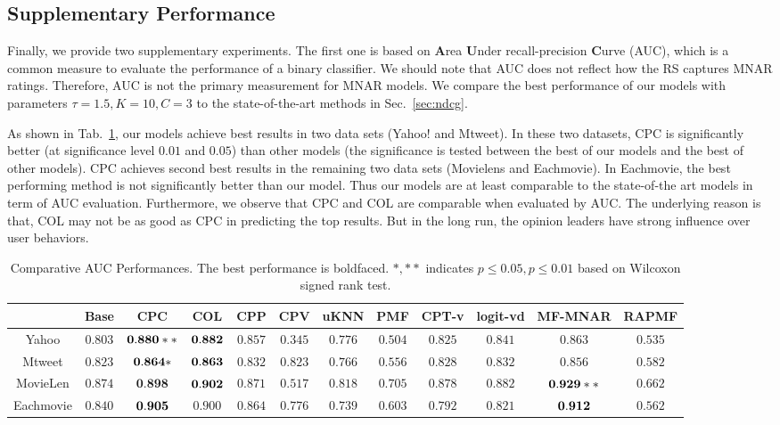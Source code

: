 \documentclass[sigconf]{acmart}
\begin{document}
\subsection{Supplementary Performance}
Finally, we provide two supplementary experiments. The first one is based on \textbf{A}rea \textbf{U}nder recall-precision \textbf{C}urve (AUC), which is a common measure to evaluate the performance of a binary classifier. We should note that AUC does not reflect how the RS captures MNAR ratings. Therefore, AUC is not the primary measurement for MNAR models. We compare the best performance of our models with parameters $\tau = 1.5, K=10, C=3$ to the state-of-the-art methods in Sec.~\ref{sec:ndcg}.


As shown in Tab.~\ref{tab:AUC}, our models achieve best results in two data sets (Yahoo! and Mtweet). In these two datasets, CPC is significantly better (at significance level $0.01$ and $0.05$) than other models (the significance is tested between the best of our models and the best of other models). CPC achieves second best results in the remaining two data sets (Movielens and Eachmovie). In Eachmovie, the best performing method is not significantly better than our model. Thus our models are at least comparable to the state-of-the art models in term of AUC evaluation. Furthermore, we observe that CPC and COL are comparable when evaluated by AUC.  The underlying reason is that, COL may not be as good as CPC in predicting the top results. But in the long run, the opinion leaders have strong influence over user behaviors. 

\begin{table}[tbp]
\centering
\caption{Comparative AUC Performances. The best performance is boldfaced. $*,**$ indicates $p\leq 0.05, p\leq 0.01$ based on Wilcoxon signed rank test.}\label{tab:AUC}
\centering
\small
\begin{tabular}{|c|c|c|c|c|c|c|c|c|c|c|c|}
\hline
& Base & CPC & COL & CPP & CPV & uKNN & PMF & CPT-v & logit-vd & MF-MNAR & RAPMF \\\hline
\hline
Yahoo & $0.803$ & $\bf{0.880}**$ & $\bf{0.882}$ & $0.857$ & $0.345$ & $0.776$ & $0.504$ & $0.825$ & $0.841$ & $0.863$ & $0.535$ \\\hline
Mtweet & $0.823$ & $\bf{0.864}*$ & $\bf{0.863}$ & $0.832$ & $0.823$ & $0.766$ & $0.556$ & $0.828$ & $0.832$ & $0.856$ & $0.582$ \\\hline
MovieLen & $0.874$ & $\textbf{0.898}$ & $\bf{0.902}$ & $0.871$ & $0.517$ & $0.818$ & $0.705$ & $0.878$ & $0.882$ & $\bf{0.929}**$ & $0.662$ \\\hline
Eachmovie & $0.840$ & $\bf{0.905}$ & $0.900$ & $0.864$ & $0.776$ & $0.739$ & $0.603$ & $0.792$ & $0.821$ & $\bf{0.912}$ & $0.562$ \\\hline
\end{tabular}
\end{table}
\end{document}
